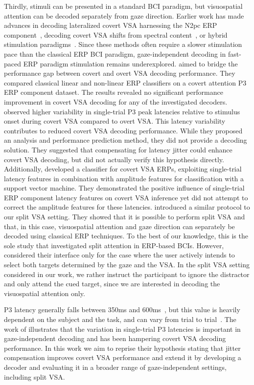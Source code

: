Thirdly, stimuli can be presented in a standard BCI paradigm, but visuospatial attention
can be decoded separately from gaze direction.
Earlier work has made advances in decoding lateralized covert
VSA harnessing the N2pc ERP component~\cite{Thiery2016,Reichert2020b,Wang2022},
decoding covert VSA shifts from spectral content~\cite{Tonin2013}, or hybrid
stimulation paradigms~\cite{Egan2017}.
Since these methods often require a slower stimulation pace than the classical
ERP BCI paradigm, gaze-independent decoding in fast-paced ERP paradigm stimulation
remains underexplored.
\cite{Aloise2012b} aimed to bridge the performance gap between covert and
overt VSA decoding performance.
They compared classical linear and non-linear ERP classifiers on a covert
attention P3 ERP component dataset.
The results revealed no significant performance improvement in covert VSA
decoding for any of the investigated decoders.
\cite{Arico2014} observed higher variability in single-trial P3 peak
latencies relative to stimulus onset during covert VSA compared to overt VSA.
This latency variability contributes to reduced covert VSA decoding performance.
While they proposed an analysis and performance prediction method, they did not provide a
decoding solution.
They suggested that compensating for latency jitter could enhance covert VSA
decoding, but did not actually verify this hypothesis directly.
Additionally, \cite{hardiansyah2020single} developed a classifier for
covert VSA ERPs, exploiting single-trial latency features in combination with
amplitude features for classification with a support vector machine.
They demonstrated the positive influence of single-trial ERP component latency
features on covert VSA inference yet did not attempt to correct the amplitude
features for these latencies.
\cite{Frenzel2011} introduced a similar protocol to our split VSA
setting.
They showed that it is possible to perform split VSA and that, in this
case, visuospatial attention and gaze direction can separately be decoded using
classical ERP techniques.
To the best of our
knowledge, this is the sole study that investigated split attention in ERP-based BCIs.
However, \cite{Frenzel2011} considered their interface only for the case
where the user actively intends to select both targets determined by the gaze
and the VSA.
In the split VSA setting considered in our work, we rather instruct the participant to ignore
the distractor and only attend the cued target, since we are interested in
decoding the visuospatial attention only.

P3 latency generally falls between 350ms and 600ms~\cite{Luck2014}, but this
value is heavily dependent on the subject and the task, and can vary from trial
to trial~\cite{Ouyang2017}.
The work of \cite{Arico2014}
illustrates that the variation in single-trial P3 latencies is important in
gaze-independent decoding and has been hampering covert VSA decoding performance.
In this work we aim to reprise their hypothesis stating that jitter compensation improves
covert VSA performance and extend it by developing a decoder and evaluating it
in a broader range of gaze-independent settings, including split VSA.
